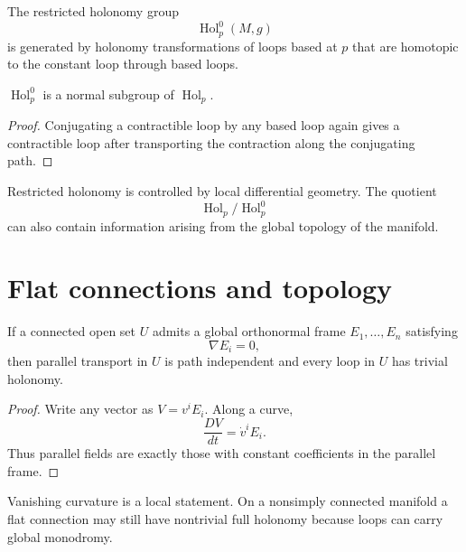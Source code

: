\begin{definition}\label{def:vii25-restricted}
The restricted holonomy group
\[
\operatorname{Hol}^0_p(M,g)
\]
is generated by holonomy transformations of loops based at \(p\) that are
homotopic to the constant loop through based loops.
\end{definition}

\begin{proposition}\label{prop:vii25-normal}
\(\operatorname{Hol}^0_p\) is a normal subgroup of
\(\operatorname{Hol}_p\).
\end{proposition}

\begin{proof}
Conjugating a contractible loop by any based loop again gives a contractible loop
after transporting the contraction along the conjugating path.
\end{proof}

\begin{remark}\label{rem:vii25-local-global}
Restricted holonomy is controlled by local differential geometry.  The quotient
\[
\operatorname{Hol}_p/\operatorname{Hol}^0_p
\]
can also contain information arising from the global topology of the manifold.
\end{remark}

\section{Flat connections and topology}

\begin{proposition}\label{prop:vii25-parallel-frame}
If a connected open set \(U\) admits a global orthonormal frame
\(E_1,\dots,E_n\) satisfying
\[
\nabla E_i=0,
\]
then parallel transport in \(U\) is path independent and every loop in \(U\) has
trivial holonomy.
\end{proposition}

\begin{proof}
Write any vector as \(V=v^iE_i\).  Along a curve,
\[
\frac{DV}{dt}=\dot v^iE_i.
\]
Thus parallel fields are exactly those with constant coefficients in the parallel
frame.
\end{proof}

\begin{warning}\label{warn:vii25-flat-global}
Vanishing curvature is a local statement.  On a nonsimply connected manifold a
flat connection may still have nontrivial full holonomy because loops can carry
global monodromy.
\end{warning}

